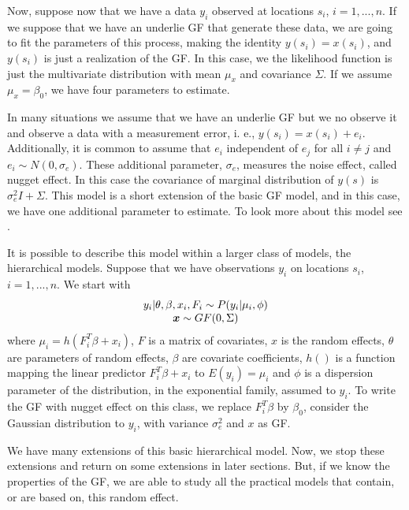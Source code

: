 Now, suppose now that we have a data $y_i$ observed at 
locations $s_i$, $i=1,...,n$. 
If we suppose that we have an underlie GF that 
generate these data, we are going to fit the 
parameters of this process, making the identity 
$y(s_i) = x(s_i)$, and $y(s_i)$ is just a 
realization of the GF. 
In this case, we the likelihood function 
is just the multivariate distribution with 
mean $\mu_x$ and covariance $\Sigma$. 
If we assume $\mu_x = \beta_0$, 
we have four parameters to estimate. 

In many situations we assume that we have an 
underlie GF but we no observe it and observe 
a data with a measurement error, i. e., 
$y(s_i) = x(s_i) + e_i$. 
Additionally, it is common to assume that $e_i$ 
independent of $e_j$ for all $i\neq j$ and 
$e_i \sim N(0, \sigma_e)$. 
These additional parameter, $\sigma_e$, measures 
the noise effect, called nugget effect. 
In this case the covariance of marginal distribution 
of $y(s)$ is $\sigma^2_eI + \Sigma$. 
This model is a short extension of the basic GF model, 
and in this case, we have one additional parameter 
to estimate. 
To look more about this model 
see \cite{diggleribeiro:2007}. 

It is possible to describe this model within a 
larger class of models, the hierarchical models. 
Suppose that we have observations $y_i$ on locations 
$s_i$, $i=1,...,n$. We start with 
\begin{equation}\begin{array}{c}
y_i|\theta,\beta,x_i,F_i \sim P(y_i|\mu_i,\phi) \\
\mbox{\protect \boldmath $x$} \sim GF(0, \Sigma)
\end{array}\end{equation}
where $\mu_i = h(F_i^{T}\beta + x_i)$, 
$F$ is a matrix of covariates, 
$x$ is the random effects, 
$\theta$ are parameters of random effects, 
$\beta$ are covariate coefficients, 
$h()$ is a function mapping the linear predictor 
$F_i^{T}\beta + x_i$ to $E(y_i) = \mu_i$ and 
$\phi$ is a dispersion parameter of the distribution, 
in the exponential family, assumed to $y_i$. 
To write the GF with nugget effect on this class, 
we replace $F_i^{T}\beta$ by $\beta_0$, 
consider the Gaussian distribution to $y_i$, with 
variance $\sigma_e^2$ and $x$ as GF.

We have many extensions of this basic hierarchical model. 
Now, we stop these extensions and return on some 
extensions in later sections. 
But, if we know the properties of the GF, 
we are able to study all the practical models 
that contain, or are based on, this random effect. 

